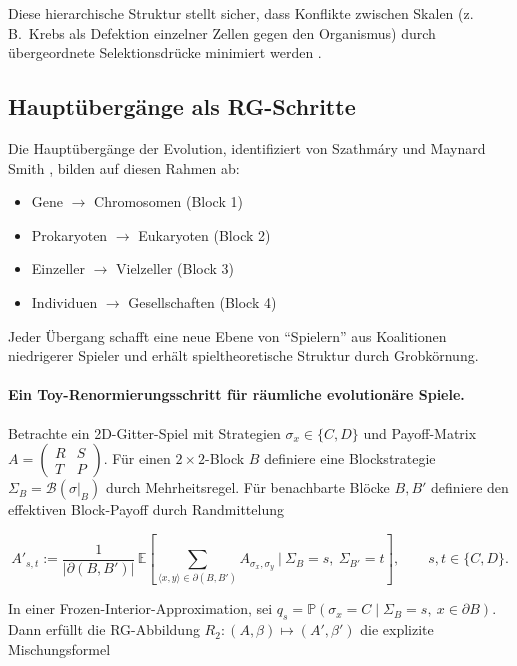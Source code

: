 \documentclass[12pt,a4paper]{article}
\theoremstyle{remark}
\begin{document}
Diese hierarchische Struktur stellt sicher, dass Konflikte zwischen Skalen (z.\,B.\ Krebs als Defektion einzelner Zellen gegen den Organismus) durch \"ubergeordnete Selektionsdr\"ucke minimiert werden \citep{ReplicatorOptimization}.

\subsection{Haupt\"uberg\"ange als RG-Schritte}

Die Haupt\"uberg\"ange der Evolution, identifiziert von Szathm\'ary und Maynard Smith \citep{SzathmaryMaynardSmith1995}, bilden auf diesen Rahmen ab:

\begin{itemize}
    \item Gene $\to$ Chromosomen (Block 1)
    \item Prokaryoten $\to$ Eukaryoten (Block 2)
    \item Einzeller $\to$ Vielzeller (Block 3)
    \item Individuen $\to$ Gesellschaften (Block 4)
\end{itemize}

Jeder \"Ubergang schafft eine neue Ebene von ``Spielern'' aus Koalitionen niedrigerer Spieler und erh\"alt spieltheoretische Struktur durch Grobk\"ornung.

\paragraph{Ein Toy-Renormierungsschritt f\"ur r\"aumliche evolution\"are Spiele.}
Betrachte ein 2D-Gitter-Spiel mit Strategien $\sigma_x\in\{C,D\}$ und Payoff-Matrix
$A=\begin{pmatrix}R&S\\ T&P\end{pmatrix}$.
F\"ur einen $2\times 2$-Block $B$ definiere eine Blockstrategie $\Sigma_B=\mathcal B(\sigma|_B)$ durch Mehrheitsregel.
F\"ur benachbarte Bl\"ocke $B,B'$ definiere den effektiven Block-Payoff durch Randmittelung

\[
A'_{s,t}
:=\frac{1}{|\partial(B,B')|}\,
\mathbb E\!\left[\sum_{\langle x,y\rangle\in\partial(B,B')} A_{\sigma_x,\sigma_y}\ \Big|\ \Sigma_B=s,\ \Sigma_{B'}=t\right],
\qquad s,t\in\{C,D\}.
\]

In einer Frozen-Interior-Approximation, sei
$q_s=\mathbb P(\sigma_x=C\mid \Sigma_B=s,\ x\in\partial B)$.
Dann erf\"ullt die RG-Abbildung $R_2:(A,\beta)\mapsto(A',\beta')$ die explizite Mischungsformel
\end{document}
